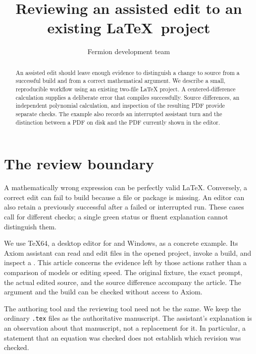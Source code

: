 \documentclass{ltugboat}
\title{Reviewing an assisted edit to an existing \LaTeX\ project}
\author{Fermion development team}
\begin{document}
\maketitle
\begin{abstract}
An assisted edit should leave enough evidence to distinguish a change to
source from a successful build and from a correct mathematical argument.
We describe a small, reproducible workflow using an existing two-file
LaTeX project. A centered-difference calculation supplies a deliberate
error that compiles successfully. Source differences, an independent
polynomial calculation, and inspection of the resulting PDF provide
separate checks. The example also records an interrupted assistant turn
and the distinction between a PDF on disk and the PDF currently shown
in the editor.
\end{abstract}

\section{The review boundary}
A mathematically wrong expression can be perfectly valid \LaTeX.
Conversely, a correct edit can fail to build because a file or package is
missing. An editor can also retain a previously successful 
after a failed or interrupted run. These cases call for different
checks; a single green status or fluent explanation cannot distinguish
them.

We use TeX64, a desktop editor for \macOS{} and Windows, as a concrete
example. Its Axiom assistant can read and edit files in the opened
project, invoke a build, and inspect a . This article concerns
the evidence left by those actions rather than a comparison of models
or editing speed. The original fixture, the exact prompt, the actual
edited source, and the source difference accompany the article.
The argument and the build can be checked without access to Axiom.

The authoring tool and the reviewing tool need not be the same.
We keep the ordinary \texttt{.tex} files as the authoritative manuscript.
The assistant's explanation is an observation about that manuscript,
not a replacement for it. In particular, a statement that an equation
was checked does not establish which revision was checked.
\end{document}
